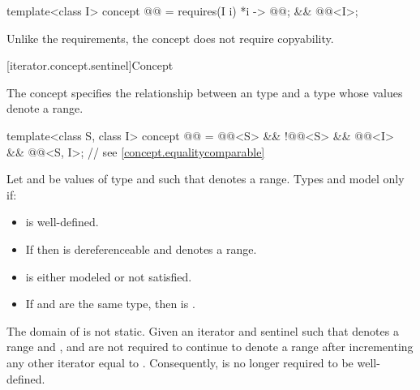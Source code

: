 \begin{codeblock}
template<class I>
  concept @@ =
    requires(I i) {
      { *i } -> @@;
    } &&
    @@<I>;
\end{codeblock}

\pnum
\begin{note}
Unlike the  requirements,
the  concept does not require copyability.
\end{note}

[iterator.concept.sentinel]{Concept }

\pnum
The  concept specifies the relationship
between an  type and a  type
whose values denote a range.

\begin{itemdecl}
template<class S, class I>
  concept @@ =
    @@<S> &&
    !@@<S> &&
    @@<I> &&
    @@<S, I>;      // see \ref{concept.equalitycomparable}
\end{itemdecl}

\begin{itemdescr}
\pnum
Let  and  be values of type  and
 such that  denotes a range. Types
 and  model  only if:
\begin{itemize}
\item {} is well-defined.

\item If  then  is dereferenceable and
       denotes a range.

\item {} is either modeled or not satisfied.

\item If  and  are the same type, then
       is .
\end{itemize}
\end{itemdescr}

\pnum
The domain of \tcode{==} is not static.
Given an iterator  and sentinel  such that 
denotes a range and ,  and  are not required to
continue to denote a range after incrementing any other iterator equal
to . Consequently,  is no longer required to be
well-defined.

